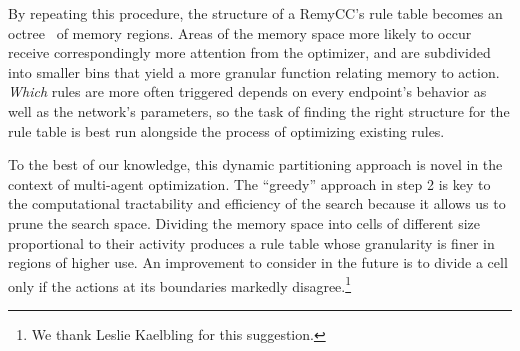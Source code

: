 By repeating this procedure, the structure of a RemyCC's rule table
becomes an
octree~\cite{octree}
of memory regions. Areas of the memory space more likely to occur
receive correspondingly more attention from the optimizer, and are
subdivided into smaller bins that yield a more granular function
relating memory to action. \emph{Which} rules are more often triggered
depends on every endpoint's behavior as well as the network's
parameters, so the task of finding the right structure for the rule
table is best run alongside the process of optimizing existing rules.

To the best of our knowledge, this dynamic partitioning approach is
novel in the context of multi-agent optimization. The ``greedy''
approach in step 2 is key to the computational tractability and
efficiency of the search because it allows us to prune the search
space. Dividing the memory space into cells of different size
proportional to their activity produces a rule table
whose granularity is finer in regions of higher use. An improvement to
consider in the future is to divide a cell only if the actions at its
boundaries markedly disagree.\footnote{We thank Leslie Kaelbling for
  this suggestion.}

